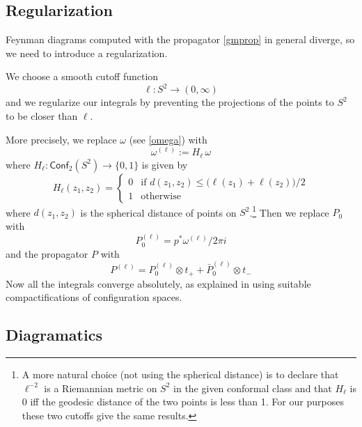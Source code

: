 \documentclass[a4paper]{amsart}
\theoremstyle{plain}
\theoremstyle{definition}
\newcommand{\g}{\mathfrak{g}}
\newcommand{\h}{\mathfrak{h}}
\newcommand{\cf}{\mathsf{Conf}}
\begin{document}

\subsection{Regularization}

 Feynman diagrams computed with the propagator \eqref{gmprop} in general diverge, so we need to introduce a regularization.

We choose a smooth cutoff function
$$\ell:S^2\to(0,\infty)$$ and  we regularize our integrals by preventing the projections of the points to $S^2$ to be closer than $\ell$.

More precisely, we replace $\omega$ (see \eqref{omega}) with
$$\omega^{(\ell)}:=H_\ell\, \omega$$
where $H_\ell:\cf_2(S^2)\to\{0,1\}$ is given by
$$
H_\ell(z_1,z_2)=
\begin{cases}
0 & \text{if } d(z_1,z_2)\leq \bigl(\ell(z_1)+\ell(z_2)\bigr)/2\\
1 & \text{otherwise}
\end{cases}
$$
where $d(z_1,z_2)$ is the spherical distance of points on $S^2$.\footnote{%
A more natural choice (not using the spherical distance) is to declare that $\ell^{-2}$ is a Riemannian metric on $S^2$ in the given conformal class and that $H_\ell$ is 0 iff the geodesic distance of the two points is less than 1. For our purposes these two cutoffs give the same results.}
Then we replace $P_0$ with
$$P_0^{(\ell)}=p^*\omega^{(\ell)}/2\pi i$$
and the propagator $P$ with
$$P^{(\ell)}=P_0^{(\ell)}\otimes t_+ + \bar P_0^{(\ell)}\otimes t_-$$
 Now all the integrals converge absolutely, as explained in \cite{AS,K} using suitable compactifications of configuration spaces.

\subsection{Diagramatics}

\end{document}
